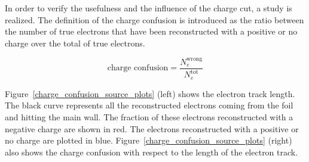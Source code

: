 \documentclass[main.tex]{subfiles}
\begin{document}
\bigskip


\noindent In order to verify the usefulness and the influence of the charge cut, a study is realized. The definition of the charge confusion is introduced as the ratio between the number of true electrons that have been reconstructed with a positive or no charge over the total of true electrons.


\begin{equation}
\text{charge confusion} = \frac{N_e^{\text{wrong}}}{N_e^{\text{tot}}}
\end{equation}     


\bigskip


\noindent Figure~\ref{charge_confusion_source_plots} (left) shows the electron track length. The black curve represents all the reconstructed electrons coming from the foil and hitting the main wall. The fraction of these electrons reconstructed with a negative charge are shown in red. The electrons reconstructed with a positive or no charge are plotted in blue. Figure~\ref{charge_confusion_source_plots} (right) also shows the charge confusion with respect to the length of the electron track. 

\bigskip
\end{document}
